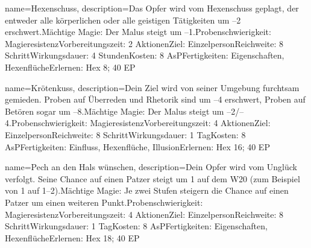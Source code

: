 {
    name={Hexenschuss},
    description={Das Opfer wird vom Hexenschuss geplagt, der entweder alle körperlichen oder alle geistigen Tätigkeiten um –2 erschwert.\newline Mächtige Magie: Der Malus steigt um –1.\newline Probenschwierigkeit: Magieresistenz\newline Vorbereitungszeit: 2 Aktionen\newline Ziel: Einzelperson\newline Reichweite: 8 Schritt\newline Wirkungsdauer: 4 Stunden\newline Kosten: 8 AsP\newline Fertigkeiten: Eigenschaften, Hexenflüche\newline Erlernen: Hex 8; 40 EP}
}


{
    name={Krötenkuss},
    description={Dein Ziel wird von seiner Umgebung furchtsam gemieden. Proben auf Überreden und Rhetorik sind um –4 erschwert, Proben auf Betören sogar um –8.\newline Mächtige Magie: Der Malus steigt um –2/–4.\newline Probenschwierigkeit: Magieresistenz\newline Vorbereitungszeit: 4 Aktionen\newline Ziel: Einzelperson\newline Reichweite: 8 Schritt\newline Wirkungsdauer: 1 Tag\newline Kosten: 8 AsP\newline Fertigkeiten: Einfluss, Hexenflüche, Illusion\newline Erlernen: Hex 16; 40 EP}
}


{
    name={Pech an den Hals wünschen},
    description={Dein Opfer wird vom Unglück verfolgt. Seine Chance auf einen Patzer steigt um 1 auf dem W20 (zum Beispiel von 1 auf 1–2).\newline Mächtige Magie: Je zwei Stufen steigern die Chance auf einen Patzer um einen weiteren Punkt.\newline Probenschwierigkeit: Magieresistenz\newline Vorbereitungszeit: 4 Aktionen\newline Ziel: Einzelperson\newline Reichweite: 8 Schritt\newline Wirkungsdauer: 1 Tag\newline Kosten: 8 AsP\newline Fertigkeiten: Eigenschaften, Hexenflüche\newline Erlernen: Hex 18; 40 EP}
}


